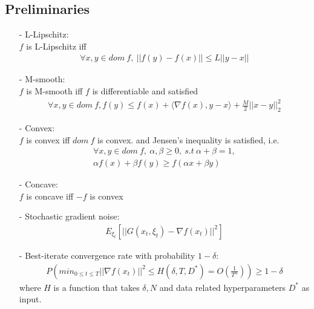 \documentclass[14pt,onecolumn,letterpaper]{extarticle}
\begin{document}
\subsection{Preliminaries}
\begin{enumerate}
    \item [-] L-Lipschitz:\\
        
        \quad$f$ is L-Lipschitz iff 
        \begin{align*}
            \forall x, y \in dom\ f,\ ||f(y)-f(x)|| \leq L||y-x||
        \end{align*}

    \item [-] M-smooth:\\
    
        \quad$f$ is M-smooth iff $f$ is differentiable and satisfied \\
        \begin{align*}
            \forall x, y \in dom\ f, f(y) \leq f(x)+\langle\nabla f(x),y-x\rangle+\frac{M}{2}||x-y||_2^2
        \end{align*}
    \item [-] Convex:\\
    
    \quad$f$ is convex iff
        $dom\ f$ is convex.
        and Jensen's inequality is satisfied, i.e.
        \begin{align*}
            \forall x, y \in dom\ f,\ \alpha, \beta \geq 0,\ s.t\ \alpha + \beta = 1,\\
            \alpha f(x) + \beta f(y) \geq f(\alpha x + \beta y)
        \end{align*}
    \item [-] Concave:\\
    
    \quad$f$ is concave iff $-f$ is convex
    \item [-] Stochastic gradient noise:
    \begin{align*} 
        E_{\xi_t}[||G(x_t, \xi_t) - \nabla f(x_t)||^2] %
    \end{align*}
    \item [-] Best-iterate convergence rate with probability $1-\delta$: 
    \begin{align*} 
        P\left(min_{0\leq t \leq T} ||\nabla f(x_t)||^2 \leq H(\delta, T, D^*) = O\left(\frac{1}{T^\alpha}\right)\right) \geq 1 - \delta
    \end{align*}
    where $H$ is a function that takes $\delta, N$ and data related hyperparameters $D^*$ as input.
    
\end{enumerate}
\end{document}
